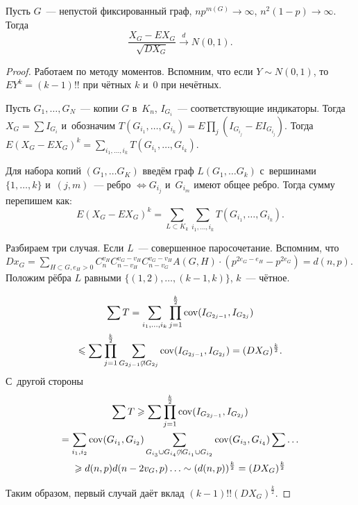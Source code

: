\documentclass{article}
\begin{document}
\begin{theorem}
	Пусть $G$~--- непустой фиксированный граф, $np^{m(G)} \rightarrow \infty$,
	$n^2(1-p) \rightarrow \infty$. Тогда
	$$ \frac{X_G - EX_G}{\sqrt{DX_G}} \overset{d}\rightarrow N(0, 1). $$
\end{theorem}
\begin{proof}
	Работаем по методу моментов. Вспомним, что если $Y \sim N(0, 1)$, то $EY^k =
	(k-1)!!$ при чётных $k$ и~0 при нечётных.

	Пусть $G_1, \ldots, G_N$~--- копии $G$ в~$K_n$, $I_{G_i}$~--- соответствующие
	индикаторы. Тогда $X_G = \sum I_{G_i}$ и~обозначим $T(G_{i_1},\ldots,G_{i_k})
	= E \prod\limits_j (I_{G_{i_j}} - EI_{G_{i_j}})$. Тогда $E(X_G - EX_G)^k =
	\sum\limits_{i_1, \ldots, i_k} T(G_{i_1}, \ldots, G_{i_k})$.

	Для набора копий $(G_1, \ldots G_K)$ введём граф $L(G_1, \ldots G_k)$
	с~вершинами $\{1, \ldots, k\}$ и~$(j, m)$~--- ребро $\Leftrightarrow G_{i_j}$
	и~$G_{i_m}$ имеют общее ребро. Тогда сумму перепишем как:
	$$ E(X_G - EX_G)^k = \sum\limits_{L \subset K_k} \sum\limits_{i_1, \ldots,
	i_k} T(G_{i_1}, \ldots, G_{i_k}). $$

	Разбираем три случая. Если $L$~--- совершенное паросочетание. Вспомним, что
	$Dx_G = \sum\limits_{H \subset G, e_H > 0} C_n^{v_H} C_{n-v_H}^{v_G-v_H}
	C_{n-v_G}^{v_G - v_H} A(G, H) \cdot (p^{2e_G - e_H} - p^{2e_G}) = d(n, p)$.
	Положим рёбра $L$ равными $\{(1, 2), \ldots, (k - 1, k)\}$, $k$~--- чётное.

	\begin{multline*}
	  \sum T = \sum\limits_{i_1,\ldots,i_k}
		\prod\limits_{j=1}^{\frac{k}{2}} \operatorname{cov}(I_{G_{2j-1}}, I_{G_{2j}}) \\
		\leqslant \sum \prod\limits_{j=1}^{\frac{k}{2}} \sum\limits_{G_{2j-1} \not\cap
		G_{2j}} \operatorname{cov}(I_{G_{2j-1}}, I_{G_{2j}}) = (DX_G)^\frac{k}{2}.
	\end{multline*}
	С~другой стороны
	\begin{multline*}
		\sum T \geqslant \sum \prod\limits_{j=1}^\frac{k}{2}
		\operatorname{cov}(I_{G_{2j-1}},I_{G_{2j}})\\
		= \sum\limits_{i_1, i_2} \operatorname{cov}(G_{i_1}, G_{i_2}) \sum\limits_{G_{i_3}
		\cup G_{i_4} \not\cap G_{i_1} \cup G_{i_2}} \operatorname{cov}(G_{i_3}, G_{i_4}) \sum
		\ldots \\
		\geqslant d(n, p) d(n - 2v_G, p) \ldots \sim (d(n, p))^\frac{k}{2} =
		(DX_G)^\frac{k}{2}
	\end{multline*}

	Таким образом, первый случай даёт вклад $(k-1)!! (DX_G)^\frac{k}{2}$.


\end{proof}
\end{document}
